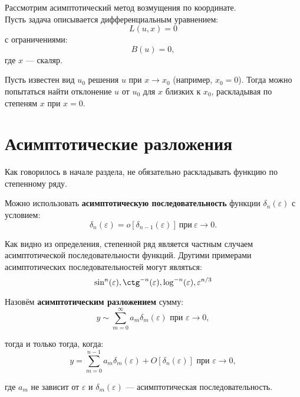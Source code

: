 Рассмотрим асимптотический метод возмущения по координате.\\
Пусть задача описывается дифференциальным уравнением:
\begin{equation*}
    L(u, x) = 0
\end{equation*}
с ограничениями:
\begin{equation*}
    B(u) = 0,
\end{equation*}
где $x$ --- скаляр.

Пусть известен вид $u_0$ решения $u$
при $x \to x_0$ (например, $x_0 = 0$).
Тогда можно попытаться найти отклонение $u$ от $u_0$
для $x$ близких к $x_0$,
раскладывая по степеням $x$ при $x = 0$.

\section*{Асимптотические разложения}

Как говорилось в начале раздела,
не обязательно раскладывать функцию по степенному ряду.

Можно использовать \textbf{асимптотическую последовательность} функции
$\delta_n(\varepsilon)$ с условием:
\begin{equation*}
    \delta_n(\varepsilon) = o[\delta_{n-1}(\varepsilon)] \
    \text{при}\ \varepsilon \to 0.
\end{equation*}

Как видно из определения,
степенной ряд является частным случаем
асимптотической последовательности функций.
Другими примерами асимптотических последовательностей могут являться:
\begin{equation*}
    \sin^n(\varepsilon), \ctg^{-n}(\varepsilon),
    \log^{-n}(\varepsilon), \varepsilon^{n/3}
\end{equation*}

Назовём \textbf{асимптотическим разложением} сумму:
\begin{equation*}
    y \sim \sum_{m=0}^\infty a_m \delta_m(\varepsilon)
    \text{ при } \varepsilon \to 0,
\end{equation*}

тогда и только тогда, когда:
\begin{equation*}
    y = \sum_{m=0}^{n-1} a_m \delta_m(\varepsilon)
    + O[\delta_n(\varepsilon)]
    \text{ при } \varepsilon \to 0,
\end{equation*}

где $a_m$ не зависит от $\varepsilon$
и $\delta_m(\varepsilon)$ --- асимптотическая последовательность.

